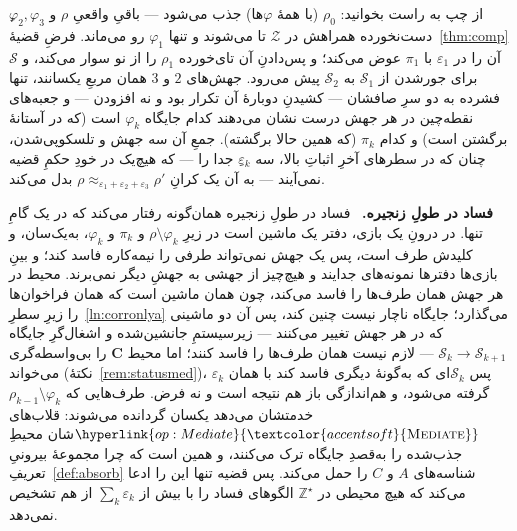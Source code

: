 \documentclass[10pt,oneside,openany]{book}
\newif\iffitdiagram \fitdiagramtrue
\newcounter{diagram}
\newcommand{\Cs}{\mathbf{C}}
\newcommand{\Zenv}{\mathcal{Z}}
\newcommand{\Adv}{\mathcal{A}}
\newcommand{\Sim}{\mathcal{S}}
\newcommand{\ZenvSet}{\mathbb{Z}}
\newcommand{\op}[1]{\textnormal{\textsc{#1}}}
\newcommand{\opl}[1]{\hyperlink{op:#1}{\textcolor{accentsoft}{\op{#1}}}}
\newcommand{\heading}[1]{\medskip\par\noindent\textcolor{accent}{\textbf{#1.}}\ }
\theoremstyle{accentdef}
\theoremstyle{accentplain}
\begin{document}
\begin{center}
{{%
}}
\fitdiagramtrue
\end{center}
\clearpage

از چپ به راست بخوانید: $\rho_0$ (با همهٔ $\varphi$ها) جذب می‌شود --- باقیِ
واقعیِ $\rho$ و $\varphi_2,\varphi_3$ِ دست‌نخورده همراهش در $\Zenv$ تا
می‌شوند و تنها $\varphi_1$ رو می‌ماند. فرضِ قضیهٔ~\ref{thm:comp} آن را در
$\varepsilon_1$ با $\pi_1$ عوض می‌کند؛ و پس‌دادنِ آن تای‌خورده $\rho_1$ را
از نو سوار می‌کند، و $\Sim$ برای جور‌شدن از $\Sim_1$ به $\Sim_2$ پیش
می‌رود. جهش‌های $2$ و $3$ همان مربعِ یکسانند، تنها فشرده به دو سرِ صافشان
--- کشیدنِ دوبارهٔ آن تکرار بود و نه افزودن --- و جعبه‌های نقطه‌چین در هر
جهش درست نشان می‌دهند کدام جایگاه $\varphi_k$ است (که در آستانهٔ برگشتن
است) و کدام $\pi_k$ (که همین حالا برگشته). جمعِ آن سه جهش و تلسکوپی‌شدن،
چنان که در سطرهای آخرِ اثباتِ بالا، سه $\varepsilon_k$ِ جدا را --- که
هیچ‌یک در خودِ حکمِ قضیه نمی‌آیند --- به آن یک کرانِ $\rho
\approx_{\varepsilon_1+\varepsilon_2+\varepsilon_3} \rho'$ بدل می‌کند.

\heading{فساد در طولِ زنجیره} فساد در طولِ زنجیره همان‌گونه رفتار می‌کند که
در یک گامِ تنها. در درونِ یک بازی، دفتر یک ماشین است در زیرِ $\rho
\setminus \varphi_k$ و $\pi_k$ و $\varphi_k$، به‌یک‌سان، و کلیدش طرف است،
پس یک جهش نمی‌تواند طرفی را نیمه‌کاره فاسد کند؛ و بینِ بازی‌ها دفترها
نمونه‌های جدایند و هیچ‌چیز از جهشی به جهشِ دیگر نمی‌برند. محیط در هر جهش
همان طرف‌ها را فاسد می‌کند، چون همان ماشین است که همان فراخوان‌ها را زیرِ
سطرِ~\ref{ln:corronlya} می‌گذارد؛ جایگاه ناچار نیست چنین کند، پس آن دو
ماشینی که در هر جهش تغییر می‌کنند --- زیرسیستمِ جانشین‌شده و اشغال‌گرِ
جایگاه $\Sim_k \to \Sim_{k+1}$ --- لازم نیست همان طرف‌ها را فاسد کنند؛ اما
محیط $\Cs$ را بی‌واسطه‌گری می‌خواند (نکتهٔ~\ref{rem:statusmed})، پس
$\Sim_k$ای که به‌گونهٔ دیگری فاسد کند با همان $\varepsilon_k$ گرفته
می‌شود، و هم‌اندازگی باز هم نتیجه است و نه فرض. طرف‌هایی که $\rho_{k-1}
\setminus \varphi_k$ خدمتشان می‌دهد یکسان گردانده می‌شوند: قلاب‌های
$\opl{Mediate}$شان محیطِ جذب‌شده را به‌قصدِ جایگاه ترک می‌کنند، و همین است
که چرا مجموعهٔ بیرونیِ تعریفِ~\ref{def:absorb} شناسه‌های $A$ و $C$ را حمل
می‌کند. پس قضیه تنها این را ادعا می‌کند که هیچ محیطی در $\ZenvSet^{\star}$
الگوهای فساد را با بیش از $\sum_k \varepsilon_k$ از هم تشخیص نمی‌دهد.
\end{document}
